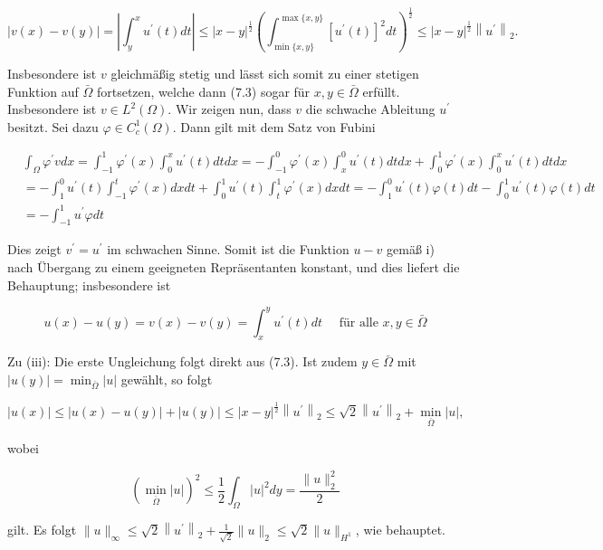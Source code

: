 \documentclass[10pt, letterpaper]{article}
\begin{document}
$$
|v(x)-v(y)|=\left|\int_{y}^{x} u^{\prime}(t) d t\right| \leq|x-y|^{\frac{1}{2}}\left(\int_{\min \{x, y\}}^{\max \{x, y\}}\left[u^{\prime}(t)\right]^{2} d t\right)^{\frac{1}{2}} \leq|x-y|^{\frac{1}{2}}\left\|u^{\prime}\right\|_{2} .
$$

Insbesondere ist $v$ gleichmäßig stetig und lässt sich somit zu einer stetigen Funktion auf $\bar{\Omega}$ fortsetzen, welche dann (7.3) sogar für $x, y \in \bar{\Omega}$ erfüllt. Insbesondere ist $v \in L^{2}(\Omega)$. Wir zeigen nun, dass $v$ die schwache Ableitung $u^{\prime}$ besitzt. Sei dazu $\varphi \in C_{c}^{1}(\Omega)$. Dann gilt mit dem Satz von Fubini

$$
\begin{aligned}
& \int_{\Omega} \varphi^{\prime} v d x=\int_{-1}^{1} \varphi^{\prime}(x) \int_{0}^{x} u^{\prime}(t) d t d x=-\int_{-1}^{0} \varphi^{\prime}(x) \int_{x}^{0} u^{\prime}(t) d t d x+\int_{0}^{1} \varphi^{\prime}(x) \int_{0}^{x} u^{\prime}(t) d t d x \\
& =-\int_{1}^{0} u^{\prime}(t) \int_{-1}^{t} \varphi^{\prime}(x) d x d t+\int_{0}^{1} u^{\prime}(t) \int_{t}^{1} \varphi^{\prime}(x) d x d t=-\int_{1}^{0} u^{\prime}(t) \varphi(t) d t-\int_{0}^{1} u^{\prime}(t) \varphi(t) d t \\
& =-\int_{-1}^{1} u^{\prime} \varphi d t
\end{aligned}
$$

Dies zeigt $v^{\prime}=u^{\prime}$ im schwachen Sinne. Somit ist die Funktion $u-v$ gemäß i) nach Übergang zu einem geeigneten Repräsentanten konstant, und dies liefert die Behauptung; insbesondere ist

$$
u(x)-u(y)=v(x)-v(y)=\int_{x}^{y} u^{\prime}(t) d t \quad \text { für alle } x, y \in \bar{\Omega}
$$

Zu (iii): Die erste Ungleichung folgt direkt aus (7.3). Ist zudem $y \in \bar{\Omega}$ mit $|u(y)|= \min _{\bar{\Omega}}|u|$ gewählt, so folgt

$$
|u(x)| \leq|u(x)-u(y)|+|u(y)| \leq|x-y|^{\frac{1}{2}}\left\|u^{\prime}\right\|_{2} \leq \sqrt{2}\left\|u^{\prime}\right\|_{2}+\min _{\bar{\Omega}}|u|,
$$

wobei

$$
\left(\min _{\bar{\Omega}}|u|\right)^{2} \leq \frac{1}{2} \int_{\Omega}|u|^{2} d y=\frac{\|u\|_{2}^{2}}{2}
$$

gilt. Es folgt $\|u\|_{\infty} \leq \sqrt{2}\left\|u^{\prime}\right\|_{2}+\frac{1}{\sqrt{2}}\|u\|_{2} \leq \sqrt{2}\|u\|_{H^{1}}$, wie behauptet.
\end{document}
